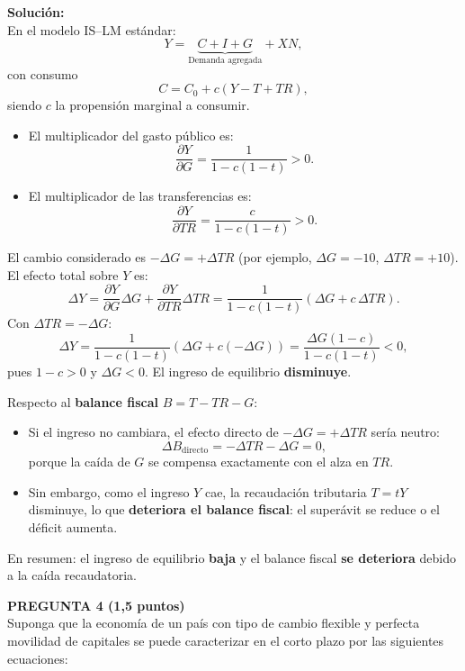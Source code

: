 \documentclass[11pt,addpoints]{article}
\begin{document}
\vspace{0.2cm}
\textbf{Solución:}\\[0.1cm]
En el modelo IS–LM estándar:
\[
Y = \underbrace{C + I + G}_{\text{Demanda agregada}} + XN,
\]
con consumo
\[
C = C_0 + c(Y - T + TR),
\]
siendo $c$ la propensión marginal a consumir.

\begin{itemize}
  \item El multiplicador del gasto público es:
  \[
  \frac{\partial Y}{\partial G} = \frac{1}{1 - c(1 - t)} > 0.
  \]
  \newpage
  \vspace*{0.5cm}
  \item El multiplicador de las transferencias es:
  \[
  \frac{\partial Y}{\partial TR} = \frac{c}{1 - c(1 - t)} > 0.
  \]
\end{itemize}

El cambio considerado es $-\Delta G = +\Delta TR$ (por ejemplo, $\Delta G = -10$, $\Delta TR = +10$). El efecto total sobre $Y$ es:
\[
\Delta Y 
= \frac{\partial Y}{\partial G}\Delta G + \frac{\partial Y}{\partial TR}\Delta TR
= \frac{1}{1 - c(1 - t)}\left(\Delta G + c\,\Delta TR\right).
\]
Con $\Delta TR = -\Delta G$:
\[
\Delta Y = \frac{1}{1 - c(1 - t)}\left(\Delta G + c(-\Delta G)\right)
= \frac{\Delta G(1 - c)}{1 - c(1 - t)} < 0,
\]
pues $1 - c > 0$ y $\Delta G < 0$. El ingreso de equilibrio \textbf{disminuye}.

\medskip
Respecto al \textbf{balance fiscal} $B = T - TR - G$:
\begin{itemize}
  \item Si el ingreso no cambiara, el efecto directo de $-\Delta G = +\Delta TR$ sería neutro:
  \[
  \Delta B_{\text{directo}} = -\Delta TR - \Delta G = 0,
  \]
  porque la caída de $G$ se compensa exactamente con el alza en $TR$.
  \item Sin embargo, como el ingreso $Y$ cae, la recaudación tributaria $T = tY$ disminuye, lo que \textbf{deteriora el balance fiscal}: el superávit se reduce o el déficit aumenta.
\end{itemize}

En resumen: el ingreso de equilibrio \textbf{baja} y el balance fiscal \textbf{se deteriora} debido a la caída recaudatoria.

\vspace{0.4cm}

\textbf{PREGUNTA 4 (1,5 puntos)}\\[0.2cm]
Suponga que la economía de un país con tipo de cambio flexible y perfecta movilidad de capitales se puede caracterizar en el corto plazo por las siguientes ecuaciones:
\end{document}
